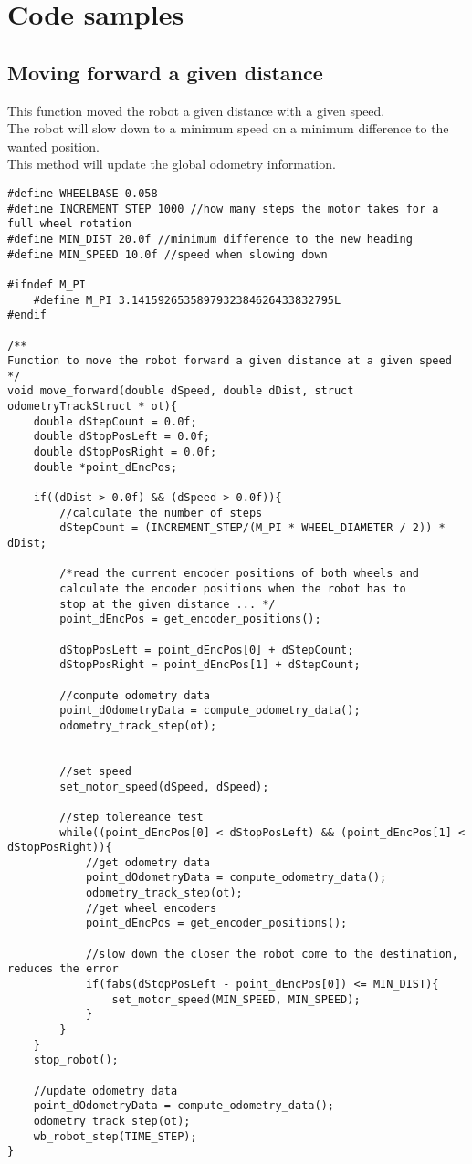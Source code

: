 \chapter{Code samples}

\section{Moving forward a given distance}
This function moved the robot a given distance with a given speed.\\
The robot will slow down to a minimum speed on a minimum difference to the wanted position.\\
This method will update the global odometry information.
\begin{lstlisting}
#define WHEELBASE 0.058 
#define INCREMENT_STEP 1000 //how many steps the motor takes for a full wheel rotation
#define MIN_DIST 20.0f //minimum difference to the new heading
#define MIN_SPEED 10.0f //speed when slowing down

#ifndef M_PI
	#define M_PI 3.1415926535897932384626433832795L
#endif

/**
Function to move the robot forward a given distance at a given speed
*/
void move_forward(double dSpeed, double dDist, struct odometryTrackStruct * ot){ 
	double dStepCount = 0.0f;
	double dStopPosLeft = 0.0f;
	double dStopPosRight = 0.0f;
	double *point_dEncPos;	
	
	if((dDist > 0.0f) && (dSpeed > 0.0f)){
		//calculate the number of steps
		dStepCount = (INCREMENT_STEP/(M_PI * WHEEL_DIAMETER / 2)) * dDist;
		
		/*read the current encoder positions of both wheels and
		calculate the encoder positions when the robot has to
		stop at the given distance ... */
		point_dEncPos = get_encoder_positions();
		
		dStopPosLeft = point_dEncPos[0] + dStepCount;
		dStopPosRight = point_dEncPos[1] + dStepCount;
		
		//compute odometry data
		point_dOdometryData = compute_odometry_data();
		odometry_track_step(ot);
		
		
		//set speed
		set_motor_speed(dSpeed, dSpeed); 
		
		//step tolereance test
		while((point_dEncPos[0] < dStopPosLeft) && (point_dEncPos[1] < dStopPosRight)){
			//get odometry data
			point_dOdometryData = compute_odometry_data();
			odometry_track_step(ot);
			//get wheel encoders
			point_dEncPos = get_encoder_positions();
			
			//slow down the closer the robot come to the destination, reduces the error
			if(fabs(dStopPosLeft - point_dEncPos[0]) <= MIN_DIST){
				set_motor_speed(MIN_SPEED, MIN_SPEED);
			}
		}
	}
	stop_robot();
	
	//update odometry data
	point_dOdometryData = compute_odometry_data();
	odometry_track_step(ot);
	wb_robot_step(TIME_STEP);
}
\end{lstlisting}

